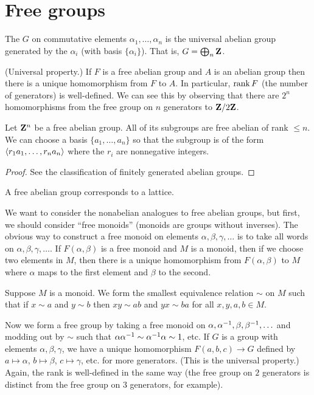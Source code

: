 \documentclass[11pt, oneside]{amsart}
\begin{document}
\section{Free groups}
\begin{definition}
The  $G$ on commutative elements $\alpha_1,\hdots,\alpha_n$ is the universal abelian group generated by the $\alpha_i$ (with basis $\{\alpha_i\}$). That is, $G = \bigoplus_n \mathbf Z$.
\end{definition}

(Universal property.) If $F$ is a free abelian group and $A$ is an abelian group then there is a unique homomorphism from $F$ to $A$. In particular, $\operatorname{rank} F$ (the number of generators) is well-defined. We can see this by observing that there are $2^n$ homomorphisms from the free group on $n$ generators to $\mathbf Z / 2\mathbf Z$.

Let $\mathbf Z^n$ be a free abelian group. All of its subgroups are free abelian of rank $\le n$. We can choose a basis $\{a_1,\hdots,a_n\}$ so that the subgroup is of the form $\left \langle r_1a_1,\hdots, r_na_n \right \rangle$ where the $r_i$ are nonnegative integers.

\begin{proof}
See the classification of finitely generated abelian groups.
\end{proof}

A free abelian group corresponds to a lattice.

We want to consider the nonabelian analogues to free abelian groups, but first, we should consider ``free monoids'' (monoids are groups without inverses). The obvious way to construct a free monoid on elements 
$\alpha,\beta,\gamma,\hdots$ is to take all words on $\alpha,\beta,\gamma,\hdots$. If $F(\alpha,\beta)$ is a free monoid and $M$ is a monoid, then if we choose two elements in $M$, then there is a unique homomorphism from $F(\alpha,\beta)$ to $M$ where $\alpha$ maps to the first element and $\beta$ to the second.

Suppose $M$ is a monoid. We form the smallest equivalence relation $\sim$ on $M$ such that if $x\sim a$ and $y\sim b$ then $xy \sim ab$ and $yx \sim ba$ for all $x,y,a,b\in M$.

Now we form a free group by taking a free monoid on $\alpha, \alpha^{-1},\beta,\beta^{-1},\hdots$ and modding out by $\sim$ such that $\alpha\alpha^{-1} \sim \alpha^{-1}\alpha \sim 1$, etc. If $G$ is a group with elements $\alpha,\beta,\gamma$, we have a unique homomorphism $F(a,b,c) \longrightarrow G$ defined by $a\mapsto \alpha$, $b\mapsto \beta$, $c\mapsto \gamma$, etc. for more generators. (This is the universal property.) Again, the rank is well-defined in the same way (the free group on $2$ generators is distinct from the free group on $3$ generators, for example).
\end{document}
